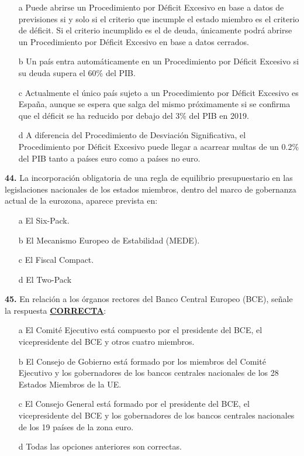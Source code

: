 \documentclass{nuevotema}
\begin{document}
\begin{itemize}
	\item[a] Puede abrirse un Procedimiento por Déficit Excesivo en base a datos de previsiones si y solo si el criterio que incumple el estado miembro es el criterio de déficit. Si el criterio incumplido es el de deuda, únicamente podrá abrirse un Procedimiento por Déficit Excesivo en base a datos cerrados.
	\item[b] Un país entra automáticamente en un Procedimiento por Déficit Excesivo si su deuda supera el 60\% del PIB.
	\item[c] Actualmente el único país sujeto a un Procedimiento por Déficit Excesivo es España, aunque se espera que salga del mismo próximamente si se confirma que el déficit se ha reducido por debajo del 3\% del PIB en 2019.
	\item[d] A diferencia del Procedimiento de Desviación Significativa, el Procedimiento por Déficit Excesivo puede llegar a acarrear multas de un 0.2\% del PIB tanto a países euro como a países no euro.
\end{itemize}



\textbf{44.} La incorporación obligatoria de una regla de equilibrio presupuestario en las legislaciones nacionales de los estados miembros, dentro del marco de gobernanza actual de la eurozona, aparece prevista en:

\begin{itemize}
	\item[a] El Six-Pack.
	\item[b] El Mecanismo Europeo de Estabilidad (MEDE).
	\item[c] El Fiscal Compact.
	\item[d] El Two-Pack
\end{itemize}

\bigskip

\textbf{45.} En relación a los órganos rectores del Banco Central Europeo (BCE), señale la respuesta \textbf{\underline{CORRECTA}}:

\begin{itemize}
	\item[a] El Comité Ejecutivo está compuesto por el presidente del BCE, el vicepresidente del BCE y otros cuatro miembros.
	\item[b] El Consejo de Gobierno está formado por los miembros del Comité Ejecutivo y los gobernadores de los bancos centrales nacionales de los 28 Estados Miembros de la UE.
	\item[c] El Consejo General está formado por el presidente del BCE, el vicepresidente del BCE y los gobernadores de los bancos centrales nacionales de los 19 países de la zona euro.
	\item[d] Todas las opciones anteriores son correctas.
\end{itemize}
\end{document}
